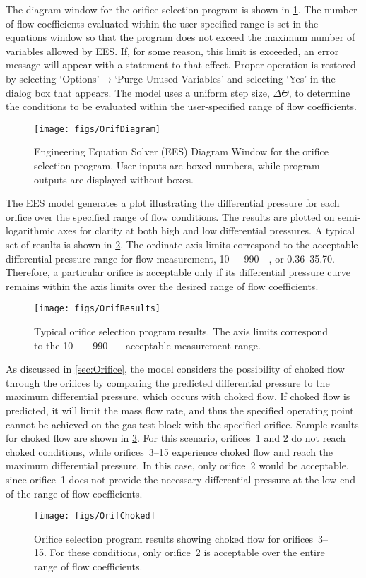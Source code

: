 The diagram window for the orifice selection program is shown in \cref{fig:OrifDiag}.
The number of flow coefficients evaluated within the 
user-specified range is set in the equations window so
that the program does not exceed the maximum number of variables allowed by EES.
If, for some reason, this limit is exceeded, an error message will appear with
a statement to that effect.
Proper operation is restored
by selecting `Options'$\to$`Purge Unused Variables' and selecting `Yes' in the dialog box that appears.
The model uses a uniform step size, $\Delta\Theta$, to determine the conditions 
to be evaluated within the user-specified range of flow coefficients.
\begin{figure}[htbp]
  \centering
  \texttt{[image: figs/OrifDiagram]}
  \caption{Engineering Equation Solver (EES) Diagram Window for the orifice
    selection program. User inputs are boxed numbers, while program outputs 
    are displayed without boxes.}
  \label{fig:OrifDiag}
\end{figure}

The EES model generates a plot illustrating
the differential pressure for each orifice over the specified range of flow conditions.
The results are plotted on semi-logarithmic axes for clarity at both high and low
differential pressures.
A typical set of results is shown in \cref{fig:OrifResults}.
The ordinate axis limits correspond to the acceptable differential pressure range
for flow measurement, \SIrange{10}{990}{\inch{}}, or \SIrange{0.36}{35.70}{\psid}.
Therefore, a particular orifice is acceptable only if its differential pressure curve remains 
within the axis limits over the desired range of flow coefficients.
\begin{figure}[tbp]
  \centering
  \texttt{[image: figs/OrifResults]}
  \caption{Typical orifice selection program results. The axis limits correspond
    to the \SIrange{10}{990}{\inch\protect{}} acceptable measurement range.}
  \label{fig:OrifResults}
\end{figure}

As discussed in \cref{sec:Orifice}, the model considers the possibility of 
choked flow through the orifices by comparing the predicted differential pressure
to the maximum differential pressure, which occurs with choked flow.
If choked flow is predicted, it will limit the mass flow rate, and thus
the specified operating point cannot be achieved on the gas test block with the 
specified orifice.
Sample results for choked flow are shown in \cref{fig:OrifChoked}.
For this scenario, orifices~1 and 2 do not reach choked conditions, while
orifices~3--15 experience choked flow and reach the maximum differential pressure.
In this case, only orifice~2 would be acceptable, since orifice~1 does not provide
the necessary differential pressure at the low end of the range of flow coefficients.
\begin{figure}[tbp]
  \centering
  \texttt{[image: figs/OrifChoked]}
  \caption{Orifice selection program results showing choked flow for orifices~3--15. 
    For these conditions, only orifice~2 is acceptable over the entire range of flow coefficients.}
  \label{fig:OrifChoked}
\end{figure}

